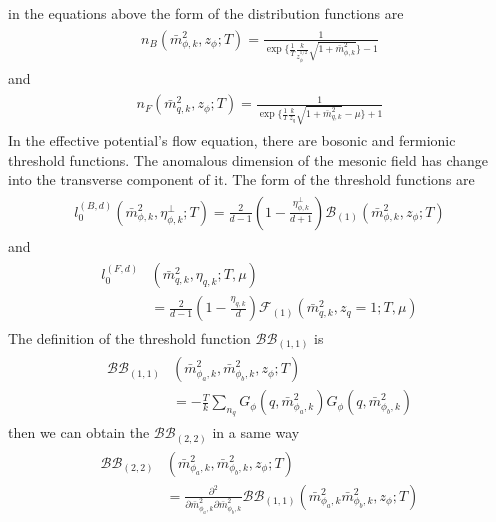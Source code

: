 \documentclass[%
reprint,
superscriptaddress,
showpacs,preprintnumbers,
 amsmath,amssymb,
 aps,
prd,
]{revtex4-1}
\begin{document}
in the equations above the form of the distribution functions are
\begin{align}
\begin{split}
n_B(\bar{m}^{2}_{\phi,k},z_\phi;T)=\frac{1}{\exp\lbrace \frac{1}{T}\frac{k}{z_\phi^{1/2}}\sqrt{1+\bar{m}^{2}_{\phi,k}}
\rbrace-1}
\end{split}
\end{align} 
and
\begin{align}
\begin{split}
n_F(\bar{m}^{2}_{q,k},z_\phi;T)=\frac{1}{\exp\lbrace \frac{1}{T}\frac{k}{z_q}\sqrt{1+\bar{m}^{2}_{q,k}}-\mu 
\rbrace+1}
\end{split}
\end{align} 
In the effective potential's flow equation, there are bosonic and fermionic threshold functions. The anomalous dimension 
of the mesonic field has change into the transverse component of it. The form of the threshold functions are
\begin{align}
\begin{split}
l_0^{(B,d)}(\bar{m}^{2}_{\phi,k},\eta^\bot_{\phi,k};T)=\frac{2}{d-1}\left( 1- \frac{\eta^{\bot}_{\phi,k}}{d+1}\right) 
\mathcal{B}_{(1)}(\bar{m}^{2}_{\phi,k},z_\phi;T)
\end{split}
\end{align} 
and
\begin{align}
\begin{split}
l_0^{(F,d)}&(\bar{m}^{2}_{q,k},\eta_{q,k};T,\mu)\\&=\frac{2}{d-1}\left( 1-\frac{\eta_{q,k}}{d} \right)\mathcal{F}_{(1)}
(\bar{m}^{2}_{q,k},z_q=1;T,\mu)
\end{split}
\end{align} 
The definition of the threshold function $\mathcal{BB}_{(1,1)}$ is
\begin{align}
\begin{split}
\mathcal{BB}_{(1,1)}&(\bar{m}^{2}_{\phi_a,k},\bar{m}^{2}_{\phi_b,k},z_\phi;T)\\
&=-\frac{T}{k}\sum_{n_q}G_\phi(q,\bar{m}^{2}_{\phi_a,k})G_\phi(q,\bar{m}^{2}_{\phi_b,k})
\end{split}
\end{align} 
then we can obtain the $\mathcal{BB}_{(2,2)}$ in a same way
\begin{align}
\begin{split}
\mathcal{BB}_{(2,2)}&(\bar{m}^{2}_{\phi_a,k},\bar{m}^{2}_{\phi_b,k},z_\phi;T)\\
&=\frac{\partial^2}{\partial\bar{m}^{2}_{\phi_a,k}\partial\bar{m}^{2}_{\phi_b,k}}\mathcal{BB}_{(1,1)}(\bar{m}^{2}_{\phi_a,k}
\bar{m}^{2}_{\phi_b,k},z_\phi;T)
\end{split}
\end{align} 
\end{document}
